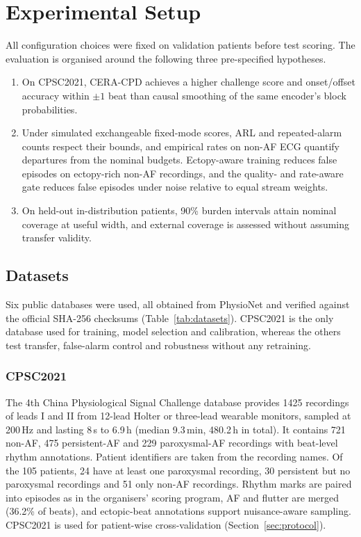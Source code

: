 \documentclass[preprint,12pt]{elsarticle}
\newcommand{\method}{CERA-CPD}
\newcommand{\1}{\mathbf{1}}
\begin{document}
\section{Experimental Setup}
\label{sec:setup}
All configuration choices were fixed on validation patients before test scoring. The evaluation is organised around the following three pre-specified hypotheses.
\begin{enumerate}
\item[H1] On CPSC2021, \method{} achieves a higher challenge score and onset/offset accuracy within $\pm1$ beat than causal smoothing of the same encoder's block probabilities.
\item[H2] Under simulated exchangeable fixed-mode scores, ARL and repeated-alarm counts respect their bounds, and empirical rates on non-AF ECG quantify departures from the nominal budgets. Ectopy-aware training reduces false episodes on ectopy-rich non-AF recordings, and the quality- and rate-aware gate reduces false episodes under noise relative to equal stream weights.
\item[H3] On held-out in-distribution patients, 90\% burden intervals attain nominal coverage at useful width, and external coverage is assessed without assuming transfer validity.
\end{enumerate}

\subsection{Datasets}
Six public databases were used, all obtained from PhysioNet \cite{goldberger2000physionet} and verified against the official SHA-256 checksums (Table~\ref{tab:datasets}). CPSC2021 is the only database used for training, model selection and calibration, whereas the others test transfer, false-alarm control and robustness without any retraining.

\subsubsection{CPSC2021}
The 4th China Physiological Signal Challenge database \cite{cpsc2021} provides 1425 recordings of leads I and II from 12-lead Holter or three-lead wearable monitors, sampled at 200\,Hz and lasting 8\,s to 6.9\,h (median 9.3\,min, 480.2\,h in total). It contains 721 non-AF, 475 persistent-AF and 229 paroxysmal-AF recordings with beat-level rhythm annotations. Patient identifiers are taken from the recording names. Of the 105 patients, 24 have at least one paroxysmal recording, 30 persistent but no paroxysmal recordings and 51 only non-AF recordings. Rhythm marks are paired into episodes as in the organisers' scoring program, AF and flutter are merged (36.2\% of beats), and ectopic-beat annotations support nuisance-aware sampling. CPSC2021 is used for patient-wise cross-validation (Section~\ref{sec:protocol}).
\end{document}
